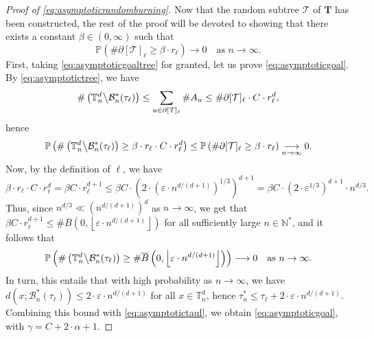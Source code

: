 \documentclass[a4paper,11pt]{article}
\begin{document}
\begin{proof}[Proof of \eqref{eq:asymptoticrandomburning}]
Now that the random subtree $\mathcal{T}$ of $\mathbf{T}$ has been constructed, the rest of the proof will be devoted to showing that there exists a constant $\beta\in(0,\infty)$ such that
\begin{equation}\label{eq:asymptoticgoaltree}
\mathbb{P}\left(\#\partial[\mathcal{T}]_\ell\geq\beta\cdot r_\ell\right)\longrightarrow0\quad\text{as $n\to\infty$.}
\end{equation}
First, taking \eqref{eq:asymptoticgoaltree} for granted, let us prove \eqref{eq:asymptoticgoal}.
By \eqref{eq:asymptotictree}, we have
\[\#\left(\mathbb{T}_n^d\middle\backslash\mathcal{B}_n^*(\tau_\ell)\right)\leq\sum_{u\in\partial[\mathcal{T}]_\ell}\#A_u\leq\#\partial[\mathcal{T}]_\ell\cdot C\cdot r_\ell^d,\]
hence
\[\mathbb{P}\left(\#\left(\mathbb{T}_n^d\middle\backslash\mathcal{B}_n^*(\tau_\ell)\right)\geq\beta\cdot r_\ell\cdot C\cdot r_\ell^d\right)\leq\mathbb{P}\left(\#\partial[\mathcal{T}]_\ell\geq\beta\cdot r_\ell\right)\underset{n\to\infty}{\longrightarrow}0.\]
Now, by the definition of $\ell$, we have
\[\beta\cdot r_\ell\cdot C\cdot r_\ell^d=\beta C\cdot r_\ell^{d+1}\leq\beta C\cdot\left(2\cdot\left(\varepsilon\cdot n^{d/(d+1)}\right)^{1/3}\right)^{d+1}=\beta C\cdot\left(2\cdot\varepsilon^{1/3}\right)^{d+1}\cdot n^{d/3}.\]
Thus, since $n^{d/3}\ll\left(n^{d/(d+1)}\right)^d$ as $n\to\infty$, we get that $\beta C\cdot r_\ell^{d+1}\leq\#\overline{B}\left(0,\left\lfloor\varepsilon\cdot n^{d/(d+1)}\right\rfloor\right)$ for all sufficiently large $n\in\mathbb{N}^*$, and it follows that
\[\mathbb{P}\left(\#\left(\mathbb{T}_n^d\middle\backslash\mathcal{B}_n^*(\tau_\ell)\right)\geq\#\overline{B}\left(0,\left\lfloor\varepsilon\cdot n^{d/(d+1)}\right\rfloor\right)\right)\longrightarrow0\quad\text{as $n\to\infty$.}\]
In turn, this entails that with high probability as $n\to\infty$, we have $d\left(x;\mathcal{B}_n^*(\tau_\ell)\right)\leq2\cdot\varepsilon\cdot n^{d/(d+1)}$ for all $x\in\mathbb{T}_n^d$, hence $\tau_n^*\leq\tau_\ell+2\cdot\varepsilon\cdot n^{d/(d+1)}$.
Combining this bound with \eqref{eq:asymptotictaul}, we obtain \eqref{eq:asymptoticgoal}, with $\gamma=C+2\cdot\alpha+1$.


\end{proof}
\end{document}
